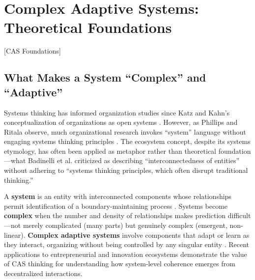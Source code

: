 \documentclass[../main.tex]{subfiles}
\begin{document}
\section{Complex Adaptive Systems: Theoretical Foundations}[CAS Foundations]

\subsection{What Makes a System ``Complex'' and ``Adaptive''}

Systems thinking has informed organization studies since Katz and Kahn's \cite{katz1978social} conceptualization of organizations as open systems \cite{scott2007organizations}. However, as Phillips and Ritala \cite{phillips2019innovation} observe, much organizational research invokes ``system'' language without engaging systems thinking principles \cite{meadows2008thinking}. The ecosystem concept, despite its systems etymology, has often been applied as metaphor rather than theoretical foundation---what Badinelli et al. \cite{badinelli2012service} criticized as describing ``interconnectedness of entities'' without adhering to ``systems thinking principles, which often disrupt traditional thinking.''

A \textbf{system} is an entity with interconnected components whose relationships permit identification of a boundary-maintaining process \cite{laszlo1996systems}. Systems become \textbf{complex} when the number and density of relationships makes prediction difficult---not merely complicated (many parts) but genuinely complex (emergent, non-linear). \textbf{Complex adaptive systems} involve components that adapt or learn as they interact, organizing without being controlled by any singular entity \cite{holland1995hidden}. Recent applications to entrepreneurial and innovation ecosystems \cite{roundy2018emergence, jarvi2018organization, dattee2018maneuvering} demonstrate the value of CAS thinking for understanding how system-level coherence emerges from decentralized interactions.
\end{document}
